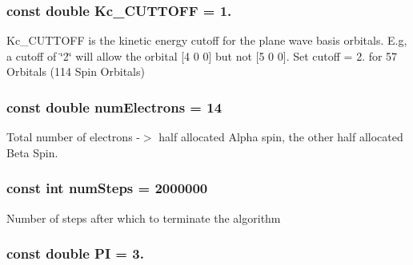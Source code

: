 \hypertarget{UEG__MAIN__binarytest_8C_aa8c8c523b8aaaef95263171d9b078d8d}{
\subsubsection[{Kc\-\_\-\-C\-U\-T\-T\-O\-F\-F}]{\setlength{\rightskip}{0pt plus 5cm}const double Kc\-\_\-\-C\-U\-T\-T\-O\-F\-F = 1.}}\label{UEG__MAIN__binarytest_8C_aa8c8c523b8aaaef95263171d9b078d8d}
Kc\-\_\-\-C\-U\-T\-T\-O\-F\-F is the kinetic energy cutoff for the plane wave basis orbitals. E.\-g, a cutoff of \char`\"{}2\char`\"{} will allow the orbital \mbox{[}4 0 0\mbox{]} but not \mbox{[}5 0 0\mbox{]}. Set cutoff = 2. for 57 Orbitals (114 Spin Orbitals) \hypertarget{UEG__MAIN__binarytest_8C_a613e167ad809e33c73b70a24822cc6f9}{
\subsubsection[{num\-Electrons}]{\setlength{\rightskip}{0pt plus 5cm}const double num\-Electrons = 14}}\label{UEG__MAIN__binarytest_8C_a613e167ad809e33c73b70a24822cc6f9}
Total number of electrons -\/$>$ half allocated Alpha spin, the other half allocated Beta Spin. \hypertarget{UEG__MAIN__binarytest_8C_a957840dbdbfa8a29c76754be143dd02f}{
\subsubsection[{num\-Steps}]{\setlength{\rightskip}{0pt plus 5cm}const int num\-Steps = 2000000}}\label{UEG__MAIN__binarytest_8C_a957840dbdbfa8a29c76754be143dd02f}
Number of steps after which to terminate the algorithm \hypertarget{UEG__MAIN__binarytest_8C_a952eac791b596a61bba0a133a3bb439f}{
\subsubsection[{P\-I}]{\setlength{\rightskip}{0pt plus 5cm}const double P\-I = 3.}}\label{UEG__MAIN__binarytest_8C_a952eac791b596a61bba0a133a3bb439f}
